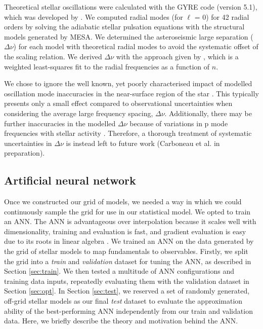 \documentclass[fleqn,usenatbib]{mnras}
\newcommand{\dnu}{\ensuremath{\Delta\nu}}
\begin{document}
Theoretical stellar oscillations were calculated with the \textsc{GYRE} code (version 5.1), which was developed by \citet{Townsend.Teitler2013}. We computed radial modes (for $\ell$ = 0) for 42 radial orders by solving the adiabatic stellar pulsation equations with the structural models generated by \textsc{MESA}. We determined the asteroseismic large separation ($\dnu$) for each model with theoretical radial modes to avoid the systematic offset of the scaling relation. We derived $\Delta \nu$ with the approach given by \citet{White.Bedding.ea2011}, which is a weighted least-squares fit to the radial frequencies as a function of $n$.

We chose to ignore the well known, yet poorly characterised impact of modelled oscillation mode inaccuracies in the near-surface region of the star \citep{Kjeldsen.Bedding.ea2008, Ball.Gizon2014, Sonoi.Samadi.ea2015}. This typically presents only a small effect compared to observational uncertainties when considering the average large frequency spacing, $\dnu$. Additionally, there may be further inaccuracies in the modelled $\dnu$ because of variations in p mode frequencies with stellar activity \citep{Chaplin.Elsworth.ea2007, Garcia.Mathur.ea2010, Kiefer.Schad.ea2017}. Therefore, a thorough treatment of systematic uncertainties in $\dnu$ is instead left to future work (Carboneau et al. in preparation). %

\subsection{Artificial neural network}\label{sec:ann}



Once we constructed our grid of models, we needed a way in which we could continuously sample the grid for use in our statistical model. We opted to train an ANN. The ANN is advantageous over interpolation because it scales well with dimensionality, training and evaluation is fast, and gradient evaluation is easy due to its roots in linear algebra \citep{Haykin2007}. We trained an ANN on the data generated by the grid of stellar models to map fundamentals to observables. Firstly, we split the grid into a \emph{train} and \emph{validation} dataset for tuning the ANN, as described in Section \ref{sec:train}. We then tested a multitude of ANN configurations and training data inputs, repeatedly evaluating them with the validation dataset in Section \ref{sec:opt}. In Section \ref{sec:test}, we reserved a set of randomly generated, off-grid stellar models as our final \emph{test} dataset to evaluate the approximation ability of the best-performing ANN independently from our train and validation data. Here, we briefly describe the theory and motivation behind the ANN.
\end{document}
